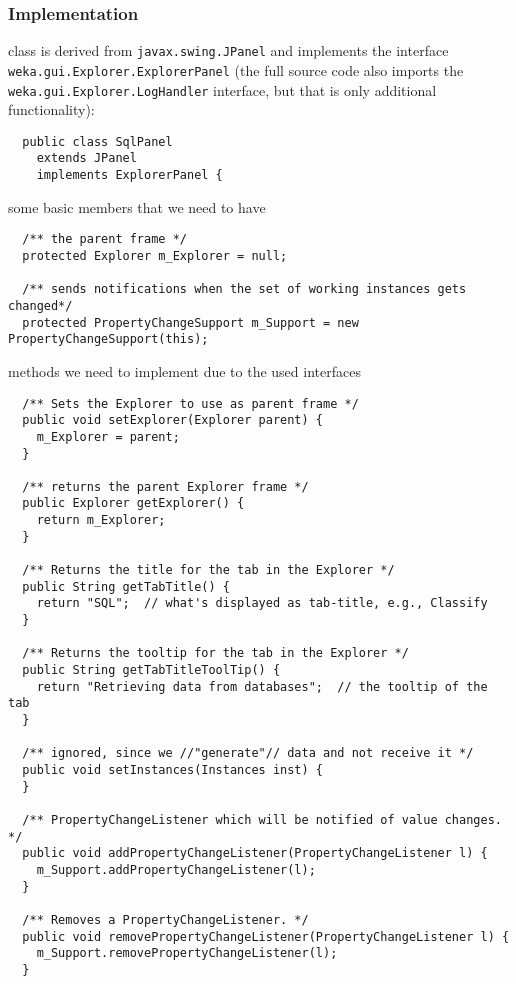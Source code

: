 \subsubsection*{Implementation}
\begin{tight_itemize}
  \item class is derived from \texttt{javax.swing.JPanel} and implements the
interface \texttt{weka.gui.Explorer.ExplorerPanel} (the full source code also
imports the \texttt{weka.gui.Explorer.LogHandler} interface, but that is only
additional functionality):
  \begin{verbatim}
  public class SqlPanel
    extends JPanel
    implements ExplorerPanel {
  \end{verbatim}

  \item some basic members that we need to have
  \begin{verbatim}
  /** the parent frame */
  protected Explorer m_Explorer = null;

  /** sends notifications when the set of working instances gets changed*/
  protected PropertyChangeSupport m_Support = new PropertyChangeSupport(this);
  \end{verbatim}

  \item methods we need to implement due to the used interfaces
  \begin{verbatim}
  /** Sets the Explorer to use as parent frame */
  public void setExplorer(Explorer parent) {
    m_Explorer = parent;
  }

  /** returns the parent Explorer frame */
  public Explorer getExplorer() {
    return m_Explorer;
  }

  /** Returns the title for the tab in the Explorer */
  public String getTabTitle() {
    return "SQL";  // what's displayed as tab-title, e.g., Classify
  }

  /** Returns the tooltip for the tab in the Explorer */
  public String getTabTitleToolTip() {
    return "Retrieving data from databases";  // the tooltip of the tab
  }

  /** ignored, since we //"generate"// data and not receive it */
  public void setInstances(Instances inst) {
  }

  /** PropertyChangeListener which will be notified of value changes. */
  public void addPropertyChangeListener(PropertyChangeListener l) {
    m_Support.addPropertyChangeListener(l);
  }

  /** Removes a PropertyChangeListener. */
  public void removePropertyChangeListener(PropertyChangeListener l) {
    m_Support.removePropertyChangeListener(l);
  }
  \end{verbatim}


\end{tight_itemize}
